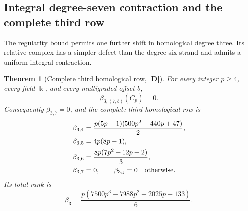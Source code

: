 \documentclass[11pt]{article}
\newtheorem{theorem}{Theorem}[section]
\theoremstyle{definition}
\theoremstyle{remark}
\newcommand{\kfield}{\Bbbk}
\begin{document}
\subsection{Integral degree-seven contraction and the complete third row}

The regularity bound permits one further shift in homological degree three. Its relative complex
has a simpler defect than the degree-six strand and admits a uniform integral contraction.

\begin{theorem}[Complete third homological row, {\bf[D]}]
\label{thm:complete-third-row}
For every integer $p\ge4$, every field $\kfield$, and every multigraded offset $b$,
\begin{equation}
\beta_{3,(7,b)}(C_p)=0.\label{eq:degree-seven-vanishing}
\end{equation}
Consequently $\beta_{3,7}=0$, and the complete third homological row is
\begin{align}
\beta_{3,4}&=\frac{p(5p-1)(500p^2-440p+47)}2,\notag\\
\beta_{3,5}&=4p(8p-1),\notag\\
\beta_{3,6}&=\frac{8p(7p^2-12p+2)}3,\notag\\
\beta_{3,7}&=0,\qquad \beta_{3,j}=0\quad\hbox{otherwise}.\label{eq:complete-third-row}
\end{align}
Its total rank is
\begin{equation}
\beta_3=\frac{p(7500p^3-7988p^2+2025p-133)}6.\label{eq:beta-three-total}
\end{equation}
\end{theorem}
\end{document}
